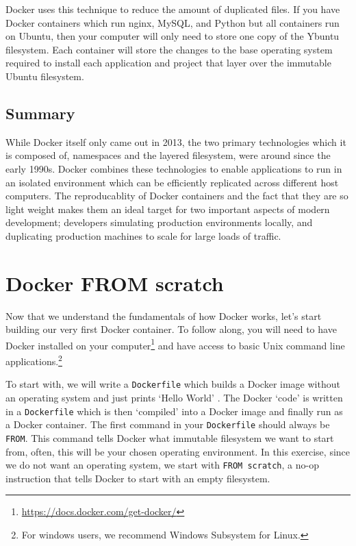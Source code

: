 Docker uses this technique to reduce the amount of duplicated files.
If you have Docker containers which run nginx, MySQL, and Python but all containers run on Ubuntu,
then your computer will only need to store one copy of the Ybuntu filesystem.
Each container will store the changes to the base operating system required to install each application and project that layer over the immutable Ubuntu filesystem.

\subsection{Summary}
While Docker itself only came out in 2013, the two primary technologies which it is composed of, namespaces and the layered filesystem,
were around since the early 1990s.
Docker combines these technologies to enable applications to run in an isolated environment which can be efficiently replicated across different host computers.
The reproducablity of Docker containers and the fact that they are so light weight makes them an ideal target for two important aspects of modern development;
developers simulating production environments locally, and duplicating production machines to scale for large loads of traffic.


\section{Docker FROM scratch}
Now that we understand the fundamentals of how Docker works, let's start building our very first Docker container.
To follow along, you will need to have Docker installed on your
computer\footnote{\url{https://docs.docker.com/get-docker/}} and have access to basic Unix command line
applications.\footnote{For windows users, we recommend Windows Subsystem for Linux.}

To start with, we will write a \texttt{Dockerfile} which builds a Docker image without an operating system and just prints `Hello World'
\cite{docker-from-scratch}.
The Docker `code' is written in a \texttt{Dockerfile} which is then `compiled' into a Docker image and finally run as a Docker container.
The first command in your \texttt{Dockerfile} should always be \texttt{FROM}.
This command tells Docker what immutable filesystem we want to start from, often, this will be your chosen operating environment.
In this exercise, since we do not want an operating system, we start with \texttt{FROM scratch},
a no-op instruction that tells Docker to start with an empty filesystem.

